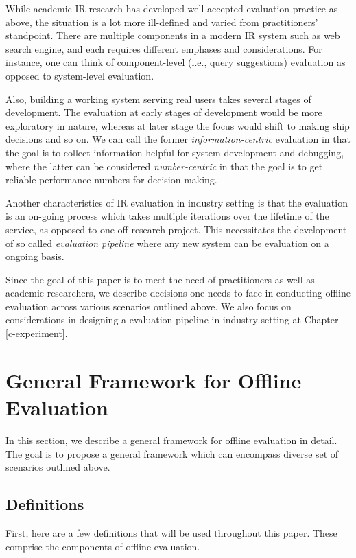 \documentclass[openany]{now} %
\begin{document}
While academic IR research has developed well-accepted evaluation practice as above, the situation is a lot more ill-defined and varied from practitioners' standpoint. There are multiple components in a modern IR system such as web search engine, and each requires different emphases and considerations. For instance, one can think of component-level (i.e., query suggestions) evaluation as opposed to system-level evaluation. 

Also, building a working system serving real users takes several stages of development. The evaluation at early stages of development would be more exploratory in nature, whereas at later stage the focus would shift to making ship decisions and so on. We can call the former \textit{information-centric} evaluation in that the goal is to collect information helpful for system development and debugging, where the latter can be considered \textit{number-centric} in that the goal is to get reliable performance numbers for decision making.

Another characteristics of IR evaluation in industry setting is that the evaluation is an on-going process which takes multiple iterations over the lifetime of the service, as opposed to one-off research project. This necessitates the development of so called \textit{evaluation pipeline} where any new system can be evaluation on a ongoing basis.  

Since the goal of this paper is to meet the need of practitioners as well as academic researchers, we describe decisions one needs to face in conducting offline evaluation across various scenarios outlined above. We also focus on considerations in designing a evaluation pipeline in industry setting at Chapter \ref{c-experiment}.

\section{General Framework for Offline Evaluation}

In this section, we describe a general framework for offline evaluation in detail. The goal is to propose a general framework which can encompass diverse set of scenarios outlined above. 

\subsection{Definitions}

First, here are a few definitions that will be used throughout this paper. These comprise the components of offline evaluation.
\end{document}
